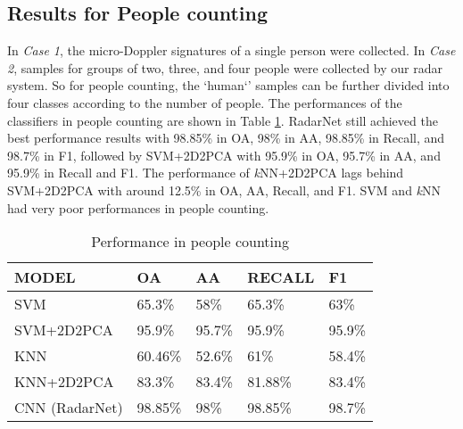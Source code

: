 \subsection{Results for People counting}
In \textit{Case 1}, the micro-Doppler signatures of a single person were collected. In \textit{Case 2}, samples for groups of two, three, and four people were collected by our radar system. So for people counting, the `human`' samples can be further divided into four classes according to the number of people. The performances of the classifiers in people counting are shown in Table \ref{tb-pc}. RadarNet still achieved the best performance results with 98.85\% in OA, 98\% in AA, 98.85\% in Recall, and 98.7\% in F1, followed by SVM+2D2PCA with 95.9\% in OA, 95.7\% in AA, and 95.9\% in Recall and F1. The performance of \textit{k}NN+2D2PCA lags behind SVM+2D2PCA with around 12.5\% in OA, AA, Recall, and F1. SVM and \textit{k}NN had very poor performances in people counting.
\begin{table}[]
\centering
\caption{Performance in people counting}
\label{tb-pc}
\begin{tabular}{|l|l|l|l|l|}
\hline
\textbf{MODEL} & \textbf{OA} & \textbf{AA} & \textbf{RECALL} & \textbf{F1} \\ \hline
SVM            & 65.3\%      & 58\%        & 65.3\%          & 63\%        \\ \hline
SVM+2D2PCA     & 95.9\%      & 95.7\%      & 95.9\%          & 95.9\%      \\ \hline
KNN            & 60.46\%     & 52.6\%      & 61\%            & 58.4\%      \\ \hline
KNN+2D2PCA     & 83.3\%      & 83.4\%      & 81.88\%         & 83.4\%      \\ \hline
CNN (RadarNet) & 98.85\%     & 98\%        & 98.85\%         & 98.7\%      \\ \hline
\end{tabular}
\end{table}

